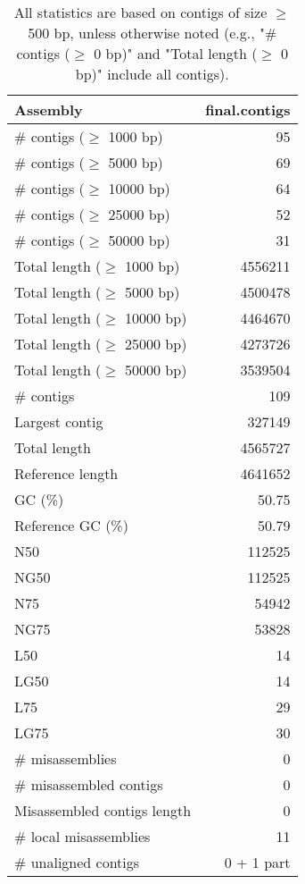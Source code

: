 \documentclass[12pt,a4paper]{article}
\begin{document}
\begin{table}[ht]
\begin{center}
\caption{All statistics are based on contigs of size $\geq$ 500 bp, unless otherwise noted (e.g., "\# contigs ($\geq$ 0 bp)" and "Total length ($\geq$ 0 bp)" include all contigs).}
\begin{tabular}{|l*{1}{|r}|}
\hline
Assembly & final.contigs \\ \hline
\# contigs ($\geq$ 1000 bp) & 95 \\ \hline
\# contigs ($\geq$ 5000 bp) & 69 \\ \hline
\# contigs ($\geq$ 10000 bp) & 64 \\ \hline
\# contigs ($\geq$ 25000 bp) & 52 \\ \hline
\# contigs ($\geq$ 50000 bp) & 31 \\ \hline
Total length ($\geq$ 1000 bp) & 4556211 \\ \hline
Total length ($\geq$ 5000 bp) & 4500478 \\ \hline
Total length ($\geq$ 10000 bp) & 4464670 \\ \hline
Total length ($\geq$ 25000 bp) & 4273726 \\ \hline
Total length ($\geq$ 50000 bp) & 3539504 \\ \hline
\# contigs & 109 \\ \hline
Largest contig & 327149 \\ \hline
Total length & 4565727 \\ \hline
Reference length & 4641652 \\ \hline
GC (\%) & 50.75 \\ \hline
Reference GC (\%) & 50.79 \\ \hline
N50 & 112525 \\ \hline
NG50 & 112525 \\ \hline
N75 & 54942 \\ \hline
NG75 & 53828 \\ \hline
L50 & 14 \\ \hline
LG50 & 14 \\ \hline
L75 & 29 \\ \hline
LG75 & 30 \\ \hline
\# misassemblies & 0 \\ \hline
\# misassembled contigs & 0 \\ \hline
Misassembled contigs length & 0 \\ \hline
\# local misassemblies & 11 \\ \hline
\# unaligned contigs & 0 + 1 part \\ \hline

\end{tabular}
\end{center}
\end{table}
\end{document}
